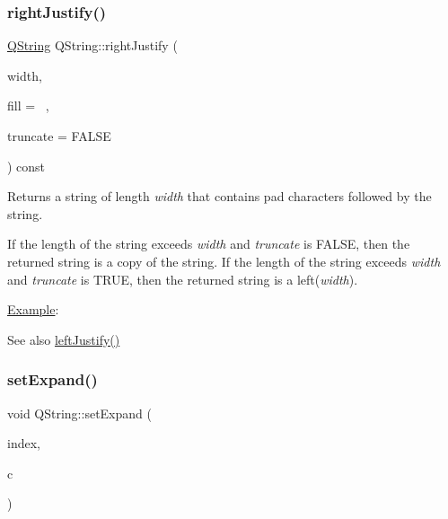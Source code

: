 \subsubsection{\texorpdfstring{rightJustify()}{rightJustify()}}
{\footnotesize\ttfamily \mbox{\hyperlink{class_q_string}{Q\+String}} Q\+String\+::right\+Justify (\begin{DoxyParamCaption}\item[{uint}]{width,  }\item[{\mbox{\hyperlink{class_q_char}{Q\+Char}}}]{fill = {\ttfamily \textquotesingle{}~\textquotesingle{}},  }\item[{bool}]{truncate = {\ttfamily FALSE} }\end{DoxyParamCaption}) const}

Returns a string of length {\itshape width} that contains pad characters followed by the string.

If the length of the string exceeds {\itshape width} and {\itshape truncate} is F\+A\+L\+SE, then the returned string is a copy of the string. If the length of the string exceeds {\itshape width} and {\itshape truncate} is T\+R\+UE, then the returned string is a left({\itshape width}).

\mbox{\hyperlink{struct_example}{Example}}\+: 
\begin{DoxyCode}{0}
\end{DoxyCode}


\begin{DoxySeeAlso}{See also}
\mbox{\hyperlink{class_q_string_a5a4d00c06bb265d1d91100c816ce1ba2}{left\+Justify()}} 
\end{DoxySeeAlso}
\mbox{\label{class_q_string_a8aa3d770063602b60782a1a77946af22}} 
\subsubsection{\texorpdfstring{setExpand()}{setExpand()}}
{\footnotesize\ttfamily void Q\+String\+::set\+Expand (\begin{DoxyParamCaption}\item[{uint}]{index,  }\item[{\mbox{\hyperlink{class_q_char}{Q\+Char}}}]{c }\end{DoxyParamCaption})}


